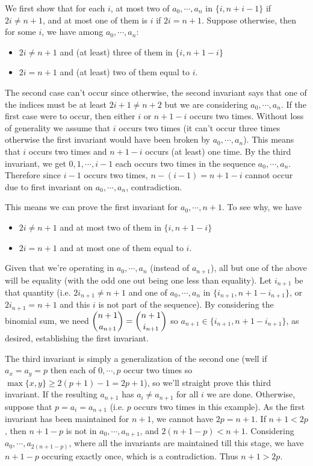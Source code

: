 \documentclass[11pt,a4paper]{article}
\begin{document}
\begin{enumerate}
	We first show that for each $i$, at most two of $a_0, \cdots , a_n$ in $\{i, n+i-1\}$ if $2i\neq n+1$, and at most one of them is $i$ if $2i=n+1$. Suppose otherwise, then for some $i$, we have among $a_0, \cdots , a_n$: 
	\begin{itemize}
		\item $2i\neq n+1$ and (at least) three of them in $\{i, n+1-i\}$
		\item $2i=n+1$ and (at least) two of them equal to $i$. 
	\end{itemize}
	The second case can't occur since otherwise, the second invariant says that one of the indices must be at least $2i+1\neq n+2$ but we are considering $a_0, \cdots , a_n$. If the first case were to occur, then either $i$ or $n+1-i$ occurs two times. Without loss of generality we assume that $i$ occurs two times (it can't occur three times otherwise the first invariant would have been broken by $a_0, \cdots , a_n$). This means that $i$ occurs two times and $n+1-i$ occurs (at least) one time. By the third invariant, we get $0, 1, \cdots , i-1$ each occurs two times in the sequence $a_0, \cdots , a_n$. Therefore since $i-1$ occurs two times, $n-(i-1)=n+1-i$ cannot occur due to first invariant on $a_0, \cdots , a_n$, contradiction. 
	
	This means we can prove the first invariant for $a_0, \cdots, n+1$. To see why, we have
	\begin{itemize}
		\item $2i\neq n+1$ and at most two of them in $\{i, n+1-i\}$
		\item $2i=n+1$ and at most one of them equal to $i$. 
	\end{itemize}
	Given that we're operating in $a_0, \cdots , a_n$ (instead of $a_{n+1}$), all but one of the above will be equality (with the odd one out being one less than equality). Let $i_{n+1}$ be that quantity (i.e. $2i_{n+1}\neq n+1$ and one of $a_0, \cdots , a_n$ in $\{i_{n+1}, n+1-i_{n+1}\}$, or $2i_{n+1}=n+1$ and this $i$ is not part of the sequence). By considering the binomial sum, we need $\dbinom{n+1}{a_{n+1}}=\dbinom{n+1}{i_{n+1}}$ so $a_{n+1}\in \{i_{n+1}, n+1-i_{n+1}\}$, as desired, establishing the first invariant. 
	
	The third invariant is simply a generalization of the second one (well if $a_x=a_y=p$ then each of $0, \cdots, p$ occur two times so $\max\{x, y\}\ge 2(p+1)-1=2p+1$), so we'll straight prove this third invariant. 
	If the resulting $a_{n+1}$ has $a_i\neq a_{n+1}$ for all $i$ we are done. Otherwise, suppose that $p=a_i=a_{n+1}$ (i.e. $p$ occurs two times in this example). As the first invariant has been maintained for $n+1$, we cannot have $2p=n+1$. If $n+1<2p$, then $n+1-p$ is not in $a_0, \cdots , a_{n+1}$, and $2(n+1-p)<n+1$. Considering $a_0, \cdots , a_{2(n+1-p)}$, where all the invariants are maintained till this stage, we have $n+1-p$ occuring exactly once, which is a contradiction. Thus $n+1>2p$. 
	

\end{enumerate}
\end{document}
